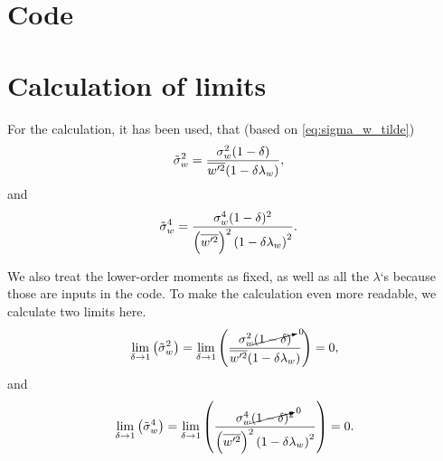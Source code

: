 \appendix


\chapter{Code}\label{ch:code}
















\chapter{Calculation of limits}\label{ch:calculation-of-limits}

For the calculation, it has been used, that (based on \cref{eq:sigma_w_tilde})
\begin{align}
    \label{eq:sigma_w_tilde_2}
    \tilde{\sigma}_w^2
    &= \frac{\sigma_w^2 (1-\delta)}{\overline{w'^2} (1-\delta\lambda_w)},
\end{align}
and
\begin{align}
    \label{eq:sigma_w_tilde_4}
    \tilde{\sigma}_w^4
    &= \frac{\sigma_w^4 (1-\delta)^2}{\left(\overline{w'^2}\right)^2 \left(1-\delta\lambda_w\right)^2}.
\end{align}

We also treat the lower-order moments as fixed, as well as all the $\lambda$`s because those are inputs in the code.
To make the calculation even more readable,
we calculate two limits here.
\begin{align}
    \label{eq:sigma_w_tilde_2_limit_delta_to_1}
    \lim_{\delta \to 1}\left(\tilde{\sigma}_w^2\right)
    = \lim_{\delta \to 1}\left(\frac{\sigma_w^2 \cancelto{0}{(1-\delta)}}{\overline{w'^2} (1-\delta\lambda_w)}\right)
    = 0,
\end{align}
and
\begin{align}
    \label{eq:sigma_w_tilde_4_limit_delta_to_1}
    \lim_{\delta \to 1}\left(\tilde{\sigma}_w^4\right)
    = \lim_{\delta \to 1}\left(\frac{\sigma_w^4 \cancelto{0}{(1-\delta)}^2}{\left(\overline{w'^2}\right)^2 \left(1-\delta\lambda_w\right)^2}\right)
    = 0.
\end{align}






